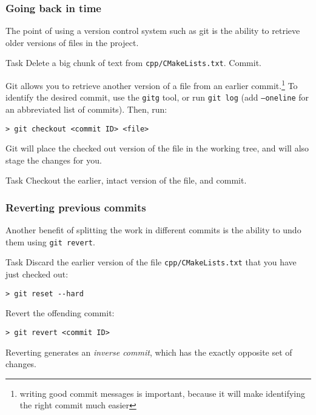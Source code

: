 \begin{frame}[fragile]

\frametitle{Going back in time}

The point of using a version control system such as git is the ability to retrieve older versions of files in the project.

	\begin{block}{Task}
	Delete a big chunk of text from \texttt{cpp/CMakeLists.txt}. Commit.
	\end{block}
	
	Git allows you to retrieve another version of a file from an earlier commit.\footnote{writing good commit messages is important, because it will make identifying \\the right commit much easier} To identify the desired commit, use the \texttt{gitg} tool, or run \texttt{git log} (add \texttt{--oneline} for an abbreviated list of commits). Then, run:
	\begin{verbatim}
> git checkout <commit ID> <file>
	\end{verbatim}
	Git will place the checked out version of the file in the working tree, and will also stage the changes for you.
	
	\begin{block}{Task}
	Checkout the earlier, intact version of the file, and commit.
	\end{block}	
	
\end{frame}


\begin{frame}[fragile]

\frametitle{Reverting previous commits}

Another benefit of splitting the work in different commits is the ability to undo them using \texttt{git revert}.

	\begin{block}{Task}
	Discard the earlier version of the file \texttt{cpp/CMakeLists.txt} that you have just checked out:
	\begin{verbatim}
> git reset --hard
	\end{verbatim}

	Revert the offending commit:
	\begin{verbatim}
> git revert <commit ID>
	\end{verbatim}

Reverting generates an \textit{inverse commit}, which has the exactly opposite set of changes.
	\end{block}

\end{frame}

